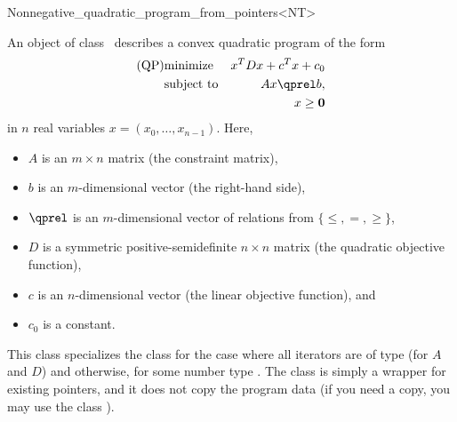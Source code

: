 \begin{ccRefClass}{Nonnegative_quadratic_program_from_pointers<NT>}


\ccDefinition
An object of class \ccRefName\ describes a convex quadratic program of the form
\begin{eqnarray*}
\mbox{(QP)}& \mbox{minimize} & x^{T}Dx+c^{T}x+c_0 \\
&\mbox{subject to}   & Ax\qprel b, \\
&                    & x \geq \mathbf{0}
\end{eqnarray*}
in $n$ real variables $x=(x_0,\ldots,x_{n-1})$.
Here, 
\begin{itemize}
\item $A$ is an $m\times n$ matrix (the constraint matrix), 
\item $b$ is an $m$-dimensional vector (the right-hand side),
\item $\qprel$ is an $m$-dimensional vector of relations 
from $\{\leq, =, \geq\}$, 
\item $D$ is a symmetric positive-semidefinite $n\times n$ matrix (the
  quadratic objective function),
\item $c$ is an $n$-dimensional vector (the linear objective
  function), and 
\item $c_0$ is a constant.
\end{itemize}

This class specializes the class
 for the case where all iterators are of type  (for
$A$ and $D$) and  otherwise, for some number type .
The class is simply a wrapper for 
existing pointers, and it does not copy the program data (if you need
a copy, you may use the class ).

\ccIsModel
{}

\ccSeeAlso
{}\\

\end{ccRefClass}
